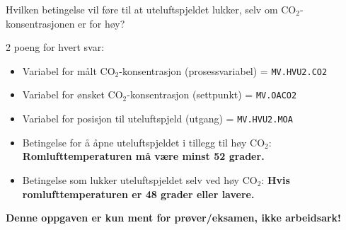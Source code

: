 \vskip 10pt

Hvilken betingelse vil føre til at uteluftspjeldet lukker, selv om CO$_{2}$-konsentrasjonen er for høy?







2 poeng for hvert svar:

\begin{itemize}
\item{} Variabel for målt CO$_{2}$-konsentrasjon (prosessvariabel) = {\tt MV.HVU2.CO2}
\vskip 10pt
\item{} Variabel for ønsket CO$_{2}$-konsentrasjon (settpunkt) = {\tt MV.OACO2}
\vskip 10pt
\item{} Variabel for posisjon til uteluftspjeld (utgang) = {\tt MV.HVU2.MOA}
\vskip 10pt
\item{} Betingelse for å åpne uteluftspjeldet i tillegg til høy CO$_{2}$: {\bf Romlufttemperaturen må være minst 52 grader.}
\vskip 10pt
\item{} Betingelse som lukker uteluftspjeldet selv ved høy CO$_{2}$: {\bf Hvis romlufttemperaturen er 48 grader eller lavere.}
\end{itemize}








{\bf Denne oppgaven er kun ment for prøver/eksamen, ikke arbeidsark!}


